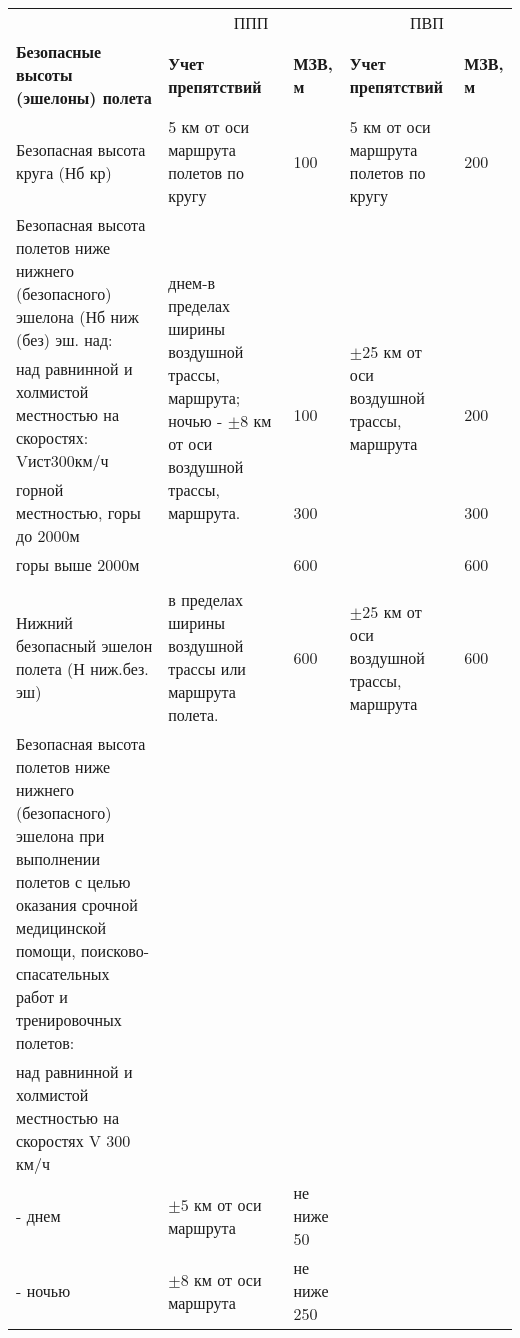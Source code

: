 \begin{appendix}
    \begin{table}[H]
        \begin{center}
        \begin{tabular}{|p{}|p{}|p{}|p{}|p{}|}
        \hline
            & \multicolumn{2}{c|}{ППП}& \multicolumn{2}{c|}{ПВП} \\
            \cline{2-5}
            \textbf{Безопасные высоты (эшелоны) полета}&\textbf{Учет препятствий}&\textbf{МЗВ, м}&\textbf{Учет препятствий}&\textbf{МЗВ, м}\\
            \hline
            Безопасная высота круга (Нб кр)&5 км от оси маршрута полетов по кругу&100&5 км от оси маршрута полетов по кругу&200\\
            \hline
            Безопасная высота полетов ниже нижнего (безопасного) эшелона (Нб ниж (без) эш. над:&\multirow[c]{5}{=}{днем-в пределах ширины воздушной трассы, маршрута; ночью -  $\pm$8 км от оси воздушной трассы, маршрута.}&&\multirow[c]{5}{=}{$\pm$25 км от оси воздушной трассы, маршрута}&\\
            над равнинной и холмистой местностью на скоростях: Vист300км/ч&&100&&200\\
            горной местностью, горы до 2000м&&300&&300\\
            горы выше 2000м&&600&&600\\[20pt]
            &&&&\\
            \hline
            Нижний безопасный эшелон полета (Н ниж.без. эш)&в пределах ширины воздушной трассы или маршрута полета.&600&$\pm25$ км от оси воздушной трассы, маршрута&600\\
            \hline
            Безопасная высота полетов ниже нижнего (безопасного) эшелона при выполнении полетов с целью оказания срочной медицинской помощи, поисково-спасательных работ и тренировочных полетов:&&&&\\
            над равнинной и холмистой местностью на скоростях V 300 км/ч&&&&\\
            - днем&$\pm5$ км от оси маршрута&не ниже
            50&&\\
            - ночью&$\pm8$ км от оси маршрута &не ниже
            250&&\\
            \hline
        \end{tabular}
        \end{center}
    \end{table}
    

\end{appendix}
